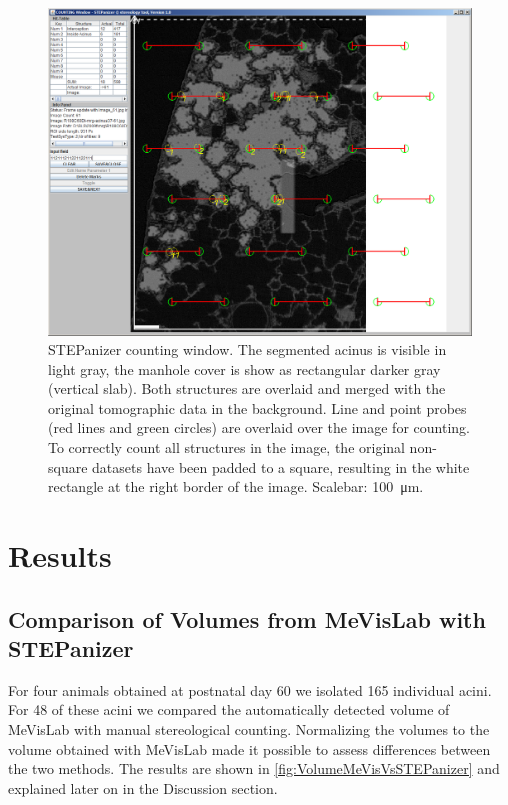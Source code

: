 \documentclass[%
	paper=a4,%
	abstract=true,%
	]{scrartcl}
\newcommand{\imsize}{\linewidth}
\begin{document}
\renewcommand{\imsize}{\linewidth}%
\begin{figure}
	\centering
	\includegraphics[width=\imsize]{img/CountingWindowSTEPanizer}
	\caption{STEPanizer counting window. The segmented acinus is visible in light gray, the manhole cover is show as rectangular darker gray (vertical slab). Both structures are overlaid and merged with the original tomographic data in the background. Line and point probes (red lines and green circles) are overlaid over the image for counting. To correctly count all structures in the image, the original non-square datasets have been padded to a square, resulting in the white rectangle at the right border of the image. Scalebar: \SI{100}{\micro\meter}.}
	\label{fig:STEPanizer}
\end{figure}

\section{Results}
\subsection{Comparison of Volumes from MeVisLab with STEPanizer}
For four animals obtained at postnatal day 60 we isolated 165 individual acini. For 48 of these acini  we compared the automatically detected volume of MeVisLab with manual stereological counting. Normalizing the volumes to the volume obtained with MeVisLab made it possible to assess differences between the two methods. The results are shown in \autoref{fig:VolumeMeVisVsSTEPanizer} and explained later on in the Discussion section.
\end{document}
